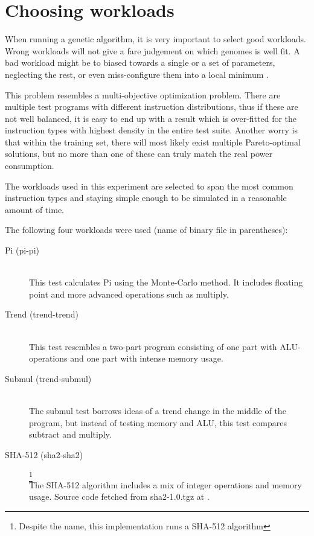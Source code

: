 \section{Choosing workloads}

When running a genetic algorithm, it is very important to select good workloads.
Wrong workloads will not give a fare judgement on which genomes is well fit. A
bad workload might be to biased towards a single or a set of parameters,
neglecting the rest, or even miss-configure them into a local minimum
\cite{magic-book-of-ga}.

This problem resembles a multi-objective optimization problem. There are
multiple test programs with different instruction distributions, thus if these
are not well balanced, it is easy to end up with a result which is over-fitted
for the instruction types with highest density in the entire test suite. Another
worry is that within the training set, there will most likely exist multiple
Pareto-optimal solutions\cite{deb2014multi}, but no more than one of these can
truly match the real power consumption.

The workloads used in this experiment are selected to span the most common
instruction types and staying simple enough to be simulated in a reasonable
amount of time.

The following four workloads were used (name of binary file in parentheses):
\begin{description}
    \item[Pi (pi-pi)] \hfill \\
        This test calculates Pi using the Monte-Carlo method. It includes
        floating point and more advanced operations such as multiply.

    \item[Trend (trend-trend)] \hfill \\
        This test resembles a two-part program consisting of
        one part with ALU-operations and one part with intense memory usage.

    \item[Submul (trend-submul)] \hfill \\
        The submul test borrows ideas of a trend change in the middle of
        the program, but instead of testing memory and ALU, this test compares
        subtract and multiply.

    \item[SHA-512 (sha2-sha2)]
        \footnote{Despite the name, this implementation runs a  SHA-512
        algorithm} \hfill \\
        The SHA-512 algorithm includes a mix of integer operations and
        memory usage. Source code fetched from sha2-1.0.tgz at \cite{sha2}.
\end{description}

